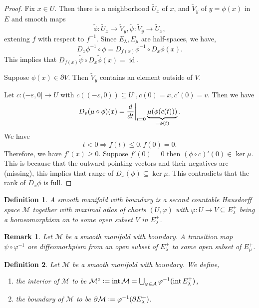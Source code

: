 \documentclass[8pt]{article}
\newtheorem{definition}{Definition}[section]
\newtheorem{remark}{Remark}[section]
\DeclareMathOperator{\interior}{int}
\DeclareMathOperator{\id}{id}
\newcommand{\defeq}{\vcentcolon=}
\newcommand{\M}[0]{\mathcal{M}}
\begin{document}
\begin{proof}
Fix $x\in U$. Then there is a neighborhood $\tilde{U}_x$ of $x$, and $\tilde{V}_y$ of $y = \phi(x)$ in $E$ and smooth maps 
\begin{equation*}
  \tilde{\phi}:\tilde{U}_x\to\tilde{V}_y,\tilde{\psi}:\tilde{V}_y\to\tilde{U}_x,
\end{equation*}
extening $f$ with respect to $f^{-1}$. Since $E_\lambda,E_\mu$ are half-spaces, we have,
\begin{equation*}
  D_x\phi^{-1}\circ\phi = D_{f(x)}\phi^{-1}\circ D_x\phi(x).
\end{equation*}
This implies that $D_{f(x)}\tilde{\psi}\circ D_x\tilde{\phi}(x) = \id$.
\par Suppose $\phi(x)\in\partial V$. Then $\tilde{V}_y$ contains an element outside of $V$. 
\par Let $c:(-\varepsilon,0]\to U$ with $c((-\varepsilon,0))\subseteq U^\circ,c(0) = x, c'(0) = v$. Then we have
\begin{equation*}
  D_v(\mu\circ\phi)(x) = {\frac {d} {dt}}\bigg{|}_{t=0}\underbrace{\mu(\phi(c(t)))}_{=\phi(t)}.
\end{equation*}
We have 
\begin{equation*}
  t<0\Rightarrow f(t)\leq 0, f(0) = 0.
\end{equation*}
Therefore, we have $f'(x)\geq 0$. Suppose $f'(0) = 0$ then $(\phi\circ c)'(0)\in\ker\mu$. This is because that the outward pointing vectors and their negatives are (missing), this implies that 
range of $D_x(\phi)\subseteq\ker\mu$. This contradicts that the rank of $D_x\phi$ is full.
\end{proof}

\begin{definition}
  A smooth manifold with boundary is a second countable Hausdorff space $\M$ together with maximal atlas of charts $(U,\varphi)$ with $\varphi:U\to V\subseteq E_\lambda^+$ being a homeomorphism on to some open subset $V$ in $E_\lambda^+$.
\end{definition}

\begin{remark}
  Let $\M$ be a smooth manifold with boundary. A transition map $\psi\circ\varphi^{-1}$ are diffeomorhpism from an open subset of $E_\lambda^+$ to some open subset of $E_\mu^+$.
\end{remark}

\begin{definition}
  Let $\M$ be a smooth manifold with boundary. We define,
  \begin{enumerate}[1).]
    \item the interior of $\M$ to be $\M^\circ\defeq\interior\M = \bigcup_{\varphi\in\mathcal{A}}\varphi^{-1}(\interior E_\lambda^+)$,
    \item the boundary of $\M$ to be $\partial\M\defeq \varphi^{-1}(\partial E_\lambda^+)$.
  \end{enumerate}
\end{definition}
\end{document}
